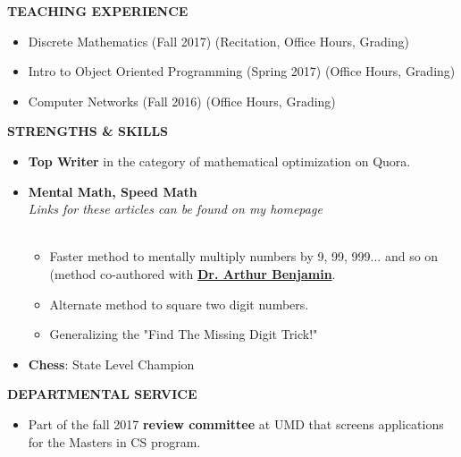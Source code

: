\documentclass[a4paper,8pt]{article}
\newcommand{\isep}{-2 pt}
\newcommand{\resheading}[1]{\begin{tcolorbox} \begin{center} #1 \end{center} \end{tcolorbox}}
\begin{document}

\resheading{\textbf{TEACHING EXPERIENCE} }
\begin{itemize}[noitemsep]
\item \noindent Discrete Mathematics (Fall 2017) (Recitation, Office Hours, Grading)
\item \noindent Intro to Object Oriented Programming (Spring 2017) (Office Hours, Grading)
\item \noindent Computer Networks (Fall 2016) (Office Hours, Grading)
\end{itemize}


\resheading{\textbf{STRENGTHS \& SKILLS} }
\begin{itemize}[noitemsep]
\item \textbf{Top Writer} in the category of mathematical optimization on Quora.

\item \textbf{Mental Math, Speed Math}\\
 \emph{Links for these articles can be found on my homepage} \\[-0.6cm]\\
	\begin{itemize}\itemsep \isep
	\item Faster method to mentally multiply numbers by 9, 99, 999... and so on (method co-authored with \href{https://www.ted.com/talks/arthur_benjamin_does_mathemagic}{\textbf{Dr. Arthur Benjamin}}.
	\item Alternate method to square two digit numbers.
	\item Generalizing the "Find The Missing Digit Trick!"
	\end{itemize}
\end{itemize}

\begin{itemize}
\item \noindent \textbf{Chess}: State Level Champion
\end{itemize}

\resheading{\textbf{DEPARTMENTAL SERVICE} }
\begin{itemize}
\item \noindent Part of the fall 2017 \textbf{review committee} at UMD that screens applications for the Masters in CS program.
\end{itemize}




\end{document}
